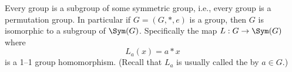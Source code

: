 Every group is a subgroup of some symmetric group, i.e.,
every group is a permutation group.
In particular if $G = (G, *, e)$ is a group, then $G$ is
isomorphic to a subgroup of $\Sym(G)$.
Specifically the map $L: G \rightarrow \Sym(G)$ where
\[
L_a(x) = a * x
\]
is a 1--1 group homomorphism.
(Recall that $L_a$ is usually called the  by $a \in G$.)

